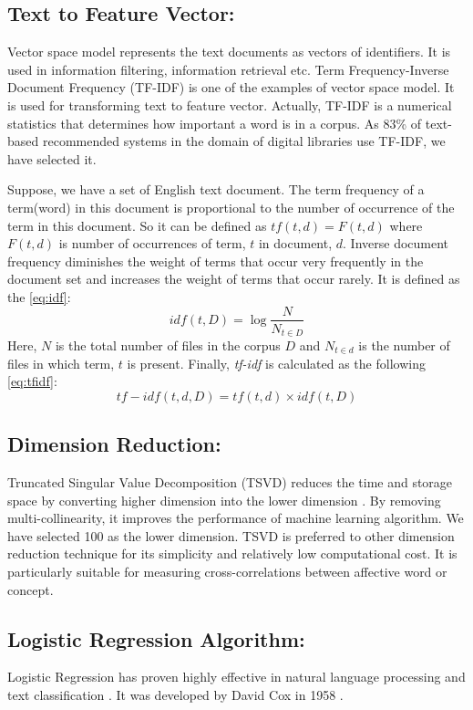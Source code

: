 \documentclass[10pt, conference]{IEEEtran}
\begin{document}
	\subsection{\textbf{Text to Feature Vector: }} Vector space model represents the text documents as vectors of identifiers. It is used in information filtering, information retrieval etc. Term Frequency-Inverse Document Frequency (TF-IDF) \cite{b20} is one of the examples of vector space model. It is used for transforming text to feature vector. Actually, TF-IDF is a numerical statistics that determines how important a word is in a corpus. As 83\% of text-based recommended systems in the domain of digital libraries use TF-IDF, we have selected it.
	
	Suppose, we have a set of English text document. The term frequency of a term(word) in this document is proportional to the number of occurrence of the term in this document. So it can be defined as $tf(t,d) = F(t,d)$ where $F(t,d)$ is number of occurrences of term, $t$ in document, $d$. Inverse document frequency diminishes the weight of terms that occur very frequently in the document set and increases the weight of terms that occur rarely. It is defined as the \eqref{eq:idf}:
	\begin{equation}
	idf(t, D) = \log \dfrac{N} {N_{t\in D}}
	\label{eq:idf}
	\end{equation}
	Here, $N$ is the total number of files in the corpus $D$ and $N_{t\in d}$ is the number of files in which term, $t$ is present. Finally, \textit{tf-idf} is calculated as the following \eqref{eq:tfidf}:
	\begin{equation}
		tf-idf(t, d, D) = tf(t, d) \times idf(t, D)
		\label{eq:tfidf}
	\end{equation}
	
	\subsection{\textbf{Dimension Reduction:}}
	Truncated Singular Value Decomposition (TSVD) reduces the time and storage space by converting higher dimension into the lower dimension \cite{b23}. By removing multi-collinearity, it improves the performance of machine learning algorithm. We have selected 100 as the lower dimension. TSVD is preferred to other dimension reduction technique for its simplicity and relatively low computational cost. It is particularly suitable for measuring cross-correlations between affective word or concept.
	
	\subsection{\textbf{Logistic Regression Algorithm:}} Logistic Regression has proven highly effective in natural language processing and text classification \cite{b20, b21}. It was developed by David Cox in 1958 \cite{b22}.
	
\end{document}
